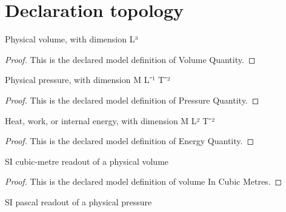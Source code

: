 \section{Declaration topology}
\begin{definition}
  \label{def:physics:phyx-mini-0340:phyxminiproblems-problemphyxmini0340-volumequantity}
  Physical volume, with dimension L³
\end{definition}
\begin{proof}
  This is the declared model definition of Volume Quantity.
\end{proof}
\begin{definition}
  \label{def:physics:phyx-mini-0340:phyxminiproblems-problemphyxmini0340-pressurequantity}
  Physical pressure, with dimension M L⁻¹ T⁻²
\end{definition}
\begin{proof}
  This is the declared model definition of Pressure Quantity.
\end{proof}
\begin{definition}
  \label{def:physics:phyx-mini-0340:phyxminiproblems-problemphyxmini0340-energyquantity}
  Heat, work, or internal energy, with dimension M L² T⁻²
\end{definition}
\begin{proof}
  This is the declared model definition of Energy Quantity.
\end{proof}
\begin{definition}
  \label{def:physics:phyx-mini-0340:phyxminiproblems-problemphyxmini0340-volumeincubicmetres}
  SI cubic-metre readout of a physical volume
\end{definition}
\begin{proof}
  This is the declared model definition of volume In Cubic Metres.
\end{proof}
\begin{definition}
  \label{def:physics:phyx-mini-0340:phyxminiproblems-problemphyxmini0340-pressureinpascals}
  SI pascal readout of a physical pressure
\end{definition}
